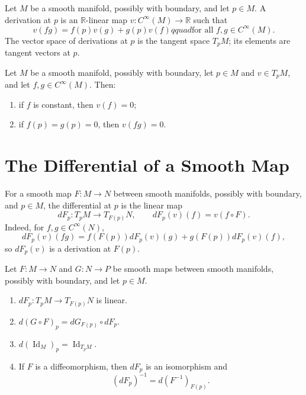 \begin{definition}
\label{def:3-13-extra-3}
\mathlibok
Let $M$ be a smooth manifold, possibly with boundary, and let $p\in M$. A
derivation at $p$ is an $\mathbb{R}$-linear map
$v:C^\infty(M)\to\mathbb{R}$ such that
\[
v(fg)=f(p)v(g)+g(p)v(f)qquad
\text{for all }f,g\in C^\infty(M). \tag{3.4}
\]
The vector space of derivations at $p$ is the tangent space $T_pM$; its
elements are tangent vectors at $p$.
\end{definition}

\begin{lemma}
\label{lem:3-4}
\leanok
{}
Let $M$ be a smooth manifold, possibly with boundary, let $p\in M$ and
$v\in T_pM$, and let $f,g\in C^\infty(M)$. Then:
\begin{enumerate}
\item if $f$ is constant, then $v(f)=0$;
\item if $f(p)=g(p)=0$, then $v(fg)=0$.
\end{enumerate}
\end{lemma}



\section{The Differential of a Smooth Map}

\begin{definition}
\label{def:3-14-extra-1}
\mathlibok
For a smooth map $F:M\to N$ between smooth manifolds, possibly with boundary,
and $p\in M$, the differential at $p$ is the linear map
\[
dF_p:T_pM\longrightarrow T_{F(p)}N,
\qquad dF_p(v)(f)=v(f\circ F).
\]
Indeed, for $f,g\in C^\infty(N)$,
\[
dF_p(v)(fg)
=f(F(p))dF_p(v)(g)+g(F(p))dF_p(v)(f),
\]
so $dF_p(v)$ is a derivation at $F(p)$.
\end{definition}

\begin{proposition}
\label{prop:3-6}
\leanok
{}
Let $F:M\to N$ and $G:N\to P$ be smooth maps between smooth manifolds,
possibly with boundary, and let $p\in M$.
\begin{enumerate}
\item $dF_p:T_pM\to T_{F(p)}N$ is linear.
\item $d(G\circ F)_p=dG_{F(p)}\circ dF_p$.
\item $d(\operatorname{Id}_M)_p=\operatorname{Id}_{T_pM}$.
\item If $F$ is a diffeomorphism, then $dF_p$ is an isomorphism and
\[
(dF_p)^{-1}=d(F^{-1})_{F(p)}.
\]
\end{enumerate}
\end{proposition}



